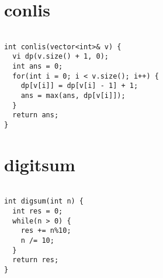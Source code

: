 \documentclass{jsarticle}
\begin{document}
\color{white}
\section{conlis}
\color{black}
\begin{lstlisting}[caption=conlis]

int conlis(vector<int>& v) {
  vi dp(v.size() + 1, 0);
  int ans = 0;
  for(int i = 0; i < v.size(); i++) {
    dp[v[i]] = dp[v[i] - 1] + 1;
    ans = max(ans, dp[v[i]]);
  }
  return ans;
}

\end{lstlisting}

\color{white}
\section{digitsum}
\color{black}
\begin{lstlisting}[caption=digitsum]

int digsum(int n) {
  int res = 0;
  while(n > 0) {
    res += n%10;
    n /= 10;
  }
  return res;
}

\end{lstlisting}

\color{white}
\end{document}
